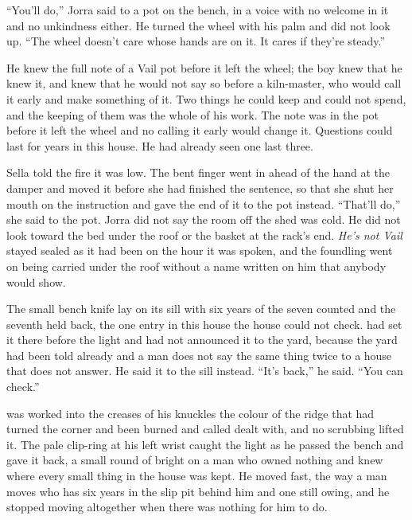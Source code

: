 “You'll do,” Jorra said to a pot on the bench, in a voice with no welcome in it and no unkindness either. He turned the wheel with his palm and did not look up. “The wheel doesn't care whose hands are on it. It cares if they're steady.”

He knew the full note of a Vail pot before it left the wheel; the boy knew that he knew it, and knew that he would not say so before a kiln-master, who would call it early and make something of it. Two things he could keep and could not spend, and the keeping of them was the whole of his work. The note was in the pot before it left the wheel and no calling it early would change it. Questions could last for years in this house. He had already seen one last three.

Sella told the fire it was low. The bent finger went in ahead of the hand at the damper and moved it before she had finished the sentence, so that she shut her mouth on the instruction and gave the end of it to the pot instead. “That'll do,” she said to the pot. Jorra did not say the room off the shed was cold. He did not look toward the bed under the  roof or the basket at the rack's end. \emph{He's not Vail} stayed sealed as it had been on the hour it was spoken, and the foundling went on being carried under the roof without a name written on him that anybody would show.

\scenebreak

The small bench knife lay on its sill with six years of the seven counted and the seventh held back, the one entry in this house the house could not check.  had set it there before the light and had not announced it to the yard, because the yard had been told already and a man does not say the same thing twice to a house that does not answer. He said it to the sill instead. “It's back,” he said. “You can check.”

 was worked into the creases of his knuckles the colour of the ridge that had turned the corner and been burned and called dealt with, and no scrubbing lifted it. The pale clip-ring at his left wrist caught the light as he passed the bench and gave it back, a small round of bright on a man who owned nothing and knew where every small thing in the house was kept. He moved fast, the way a man moves who has six years in the slip pit behind him and one still owing, and he stopped moving altogether when there was nothing for him to do.

